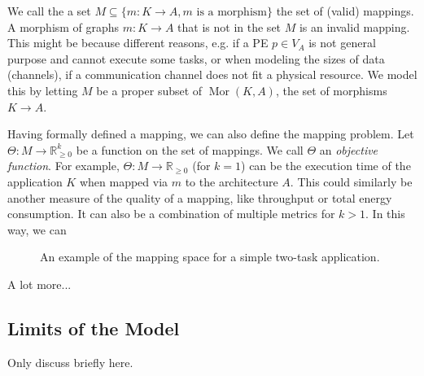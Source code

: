 We call the a set $M \subseteq \{m : K \rightarrow A, m \text{ is a morphism} \}$ the set of (valid) mappings. A morphism of graphs $m : K \rightarrow A$ that is not in the set $M$ is an invalid mapping.
This might be because different reasons, e.g. if a \ac{PE} $p \in V_A$ is not general purpose and cannot execute some tasks, or when modeling the sizes of data (channels), if a communication channel does not fit a physical resource.
We model this by letting $M$ be a proper subset of $\operatorname{Mor}(K,A)$, the set of morphisms $K \rightarrow A$.

Having formally defined a mapping, we can also define the mapping problem. Let $\Theta : M \rightarrow \mathbb{R}_{\geq 0}^k$  be a function on the set of mappings. We call $\Theta$ an \emph{objective function}.
For example, $\Theta: M \rightarrow \mathbb{R}_{\geq 0}$ (for $k = 1$) can be the execution time of the application $K$ when mapped via $m$ to the architecture $A$.
This could similarly be another measure of the quality of a mapping, like throughput or total energy consumption. It can also be a combination of multiple metrics for $k > 1$.
In this way, we can 

\begin{figure}[h]
	\centering
\resizebox{0.95\textwidth}{!}{
   \begin{tikzpicture}
     
   \end{tikzpicture}
 }
   \caption{An example of the mapping space for a simple two-task application.}
   \label{fig:mapping_space_example}
\end{figure}

A lot more...\cite{singh2013mapping} \cite{marwedel2011mapping}

\subsection{Limits of the Model}
Only discuss briefly here.
